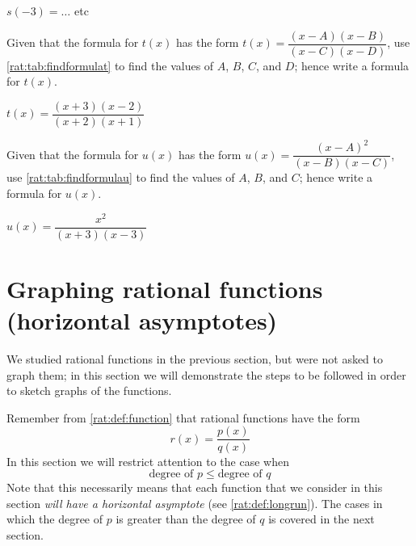 \begin{exercises}
\begin{problem}
\begin{subproblem}
\begin{shortsolution}
			 $s(-3)=\ldots$ etc
		 \end{shortsolution}
	 \end{subproblem}
	 \begin{subproblem}
		 Given that the formula for $t(x)$ has  the form $t(x)=\dfrac{(x-A)(x-B)}{(x-C)(x-D)}$, use \cref{rat:tab:findformulat} to find the
		 values of $A$, $B$, $C$, and $D$; hence write a formula for $t(x)$.
		 \begin{shortsolution}
			 $t(x)=\dfrac{(x+3)(x-2)}{(x+2)(x+1)}$
		 \end{shortsolution}
	 \end{subproblem}
	 \begin{subproblem}
		 Given that the formula for $u(x)$ has  the form $u(x)=\dfrac{(x-A)^2}{(x-B)(x-C)}$, use \cref{rat:tab:findformulau} to find the
		 values of $A$, $B$, and $C$; hence write a formula for $u(x)$.
		 \begin{shortsolution}
			 $u(x)=\dfrac{x^2}{(x+3)(x-3)}$
		 \end{shortsolution}
	 \end{subproblem}
	 \end{problem}
	 \end{exercises}

\section{Graphing rational functions (horizontal asymptotes)}
 We studied rational functions in the previous section, but were
 not asked to graph them; in this section we will demonstrate the
 steps to be followed in order to sketch graphs of the functions.

 Remember from \vref{rat:def:function} that rational functions have
 the form
 \[
	 r(x)=\frac{p(x)}{q(x)}
 \]
 In this section we will restrict attention to the case when
 \[
	 \text{degree of }p\leq \text{degree of }q
 \]
 Note that this necessarily means that each function that we consider
 in this section \emph{will have a horizontal asymptote} (see \vref{rat:def:longrun}).
 The cases in which the degree of $p$ is greater than the degree of $q$
 is covered in the next section.

